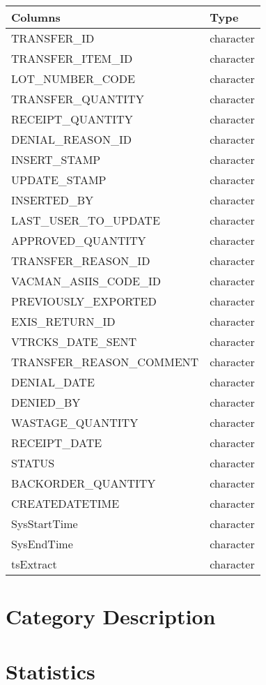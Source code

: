 \documentclass[
  letterpaper,
  DIV=11,
  numbers=noendperiod]{scrreprt}
\begin{document}
\begin{longtable}{ll}
\toprule
Columns & Type \\ 
\midrule
TRANSFER\_ID & character \\ 
TRANSFER\_ITEM\_ID & character \\ 
LOT\_NUMBER\_CODE & character \\ 
TRANSFER\_QUANTITY & character \\ 
RECEIPT\_QUANTITY & character \\ 
DENIAL\_REASON\_ID & character \\ 
INSERT\_STAMP & character \\ 
UPDATE\_STAMP & character \\ 
INSERTED\_BY & character \\ 
LAST\_USER\_TO\_UPDATE & character \\ 
APPROVED\_QUANTITY & character \\ 
TRANSFER\_REASON\_ID & character \\ 
VACMAN\_ASIIS\_CODE\_ID & character \\ 
PREVIOUSLY\_EXPORTED & character \\ 
EXIS\_RETURN\_ID & character \\ 
VTRCKS\_DATE\_SENT & character \\ 
TRANSFER\_REASON\_COMMENT & character \\ 
DENIAL\_DATE & character \\ 
DENIED\_BY & character \\ 
WASTAGE\_QUANTITY & character \\ 
RECEIPT\_DATE & character \\ 
STATUS & character \\ 
BACKORDER\_QUANTITY & character \\ 
CREATEDATETIME & character \\ 
SysStartTime & character \\ 
SysEndTime & character \\ 
tsExtract & character \\ 
\bottomrule
\end{longtable}

\hypertarget{category-description-41}{%
\section*{Category Description}\label{category-description-41}}

\hypertarget{statistics-41}{%
\section*{Statistics}\label{statistics-41}}
\end{document}
